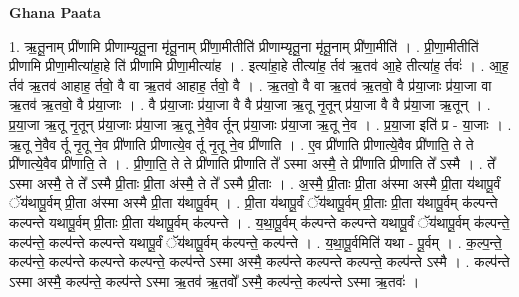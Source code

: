 \documentclass[17pt]{extarticle}
\begin{document}
\textbf{Ghana Paata } \newline

1. ऋ॒तू॒नाम् प्री॑णामि प्रीणाम्यृतू॒ना मृ॑तू॒नाम् प्री॑णा॒मीतीति॑ प्रीणाम्यृतू॒ना मृ॑तू॒नाम् प्री॑णा॒मीति॑ । . प्री॒णा॒मीतीति॑ प्रीणामि प्रीणा॒मीत्या॑हा॒हे ति॑ प्रीणामि प्रीणा॒मीत्या॑ह । . इत्या॑हा॒हे तीत्या॑ह॒ र्तव॑ ऋ॒तव॑ आ॒हे तीत्या॑ह॒ र्तवः॑ । . आ॒ह॒ र्तव॑ ऋ॒तव॑ आहाह॒ र्तवो॒ वै वा ऋ॒तव॑ आहाह॒ र्तवो॒ वै । . ऋ॒तवो॒ वै वा ऋ॒तव॑ ऋ॒तवो॒ वै प्र॑या॒जाः प्र॑या॒जा वा ऋ॒तव॑ ऋ॒तवो॒ वै प्र॑या॒जाः । . वै प्र॑या॒जाः प्र॑या॒जा वै वै प्र॑या॒जा ऋ॒तू नृ॒तून् प्र॑या॒जा वै वै प्र॑या॒जा ऋ॒तून् । . प्र॒या॒जा ऋ॒तू नृ॒तून् प्र॑या॒जाः प्र॑या॒जा ऋ॒तू ने॒वैव र्तून् प्र॑या॒जाः प्र॑या॒जा ऋ॒तू ने॒व । . प्र॒या॒जा इति॑ प्र - या॒जाः । . ऋ॒तू ने॒वैव र्तू नृ॒तू ने॒व प्री॑णाति प्रीणात्ये॒व र्तू नृ॒तू ने॒व प्री॑णाति । . ए॒व प्री॑णाति प्रीणात्ये॒वैव प्री॑णाति॒ ते ते प्री॑णात्ये॒वैव प्री॑णाति॒ ते । . प्री॒णा॒ति॒ ते ते प्री॑णाति प्रीणाति ते᳚ ऽस्मा अस्मै॒ ते प्री॑णाति प्रीणाति ते᳚ ऽस्मै । . ते᳚ ऽस्मा अस्मै॒ ते ते᳚ ऽस्मै प्री॒ताः प्री॒ता अ॑स्मै॒ ते ते᳚ ऽस्मै प्री॒ताः । . अ॒स्मै॒ प्री॒ताः प्री॒ता अ॑स्मा अस्मै प्री॒ता य॑थापू॒र्वं ॅय॑थापू॒र्वम् प्री॒ता अ॑स्मा अस्मै प्री॒ता य॑थापू॒र्वम् । . प्री॒ता य॑थापू॒र्वं ॅय॑थापू॒र्वम् प्री॒ताः प्री॒ता य॑थापू॒र्वम् क॑ल्पन्ते कल्पन्ते यथापू॒र्वम् प्री॒ताः प्री॒ता य॑थापू॒र्वम् क॑ल्पन्ते । . य॒था॒पू॒र्वम् क॑ल्पन्ते कल्पन्ते यथापू॒र्वं ॅय॑थापू॒र्वम् क॑ल्पन्ते॒ कल्प॑न्ते॒ कल्प॑न्ते कल्पन्ते यथापू॒र्वं ॅय॑थापू॒र्वम् क॑ल्पन्ते॒ कल्प॑न्ते । . य॒था॒पू॒र्वमिति॑ यथा - पू॒र्वम् । . क॒ल्प॒न्ते॒ कल्प॑न्ते॒ कल्प॑न्ते कल्पन्ते कल्पन्ते॒ कल्प॑न्ते ऽस्मा अस्मै॒ कल्प॑न्ते कल्पन्ते कल्पन्ते॒ कल्प॑न्ते ऽस्मै । . कल्प॑न्ते ऽस्मा अस्मै॒ कल्प॑न्ते॒ कल्प॑न्ते ऽस्मा ऋ॒तव॑ ऋ॒तवो᳚ ऽस्मै॒ कल्प॑न्ते॒ कल्प॑न्ते ऽस्मा ऋ॒तवः॑ । \newline
\end{document}
